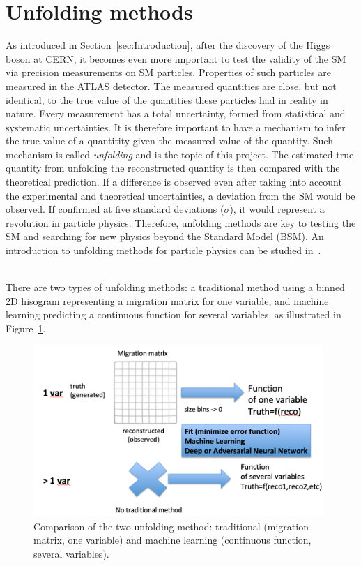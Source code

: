 \section{Unfolding methods}
\label{sec:UnfoldingMethods}

As introduced in Section~\ref{sec:Introduction}, after the discovery of the Higgs boson at CERN, it becomes even more important to test the validity of the SM via precision measurements on SM particles. Properties of such particles are measured in the ATLAS detector. The measured quantities are close, but not identical, to the true value of the quantities these particles had in reality in nature. Every measurement has a total uncertainty, formed from statistical and systematic uncertainties. It is therefore important to have a mechanism to infer the true value of a quantitity given the measured value of the quantity. Such mechanism is called \emph{unfolding} and is the topic of this project. The estimated true quantity from unfolding the reconstructed quantity is then compared with the theoretical prediction. If a difference is observed even after taking into account the experimental and theoretical uncertainties, a deviation from the SM would be observed. If confirmed at five standard deviations ($\sigma$), it would represent a revolution in particle physics. Therefore, unfolding methods are key to testing the SM and searching for new physics beyond the Standard Model (BSM). An introduction to unfolding methods for particle physics can be studied in~\cite{UnfoldingStatSchool}.

\ \\There are two types of unfolding methods: a traditional method using a binned 2D hisogram representing a migration matrix for one variable, and machine learning predicting a continuous function for several variables, as illustrated in Figure~\ref{fig:TwoUnfoldingTechniques}. 

\begin{figure}[t]
  \centering
  \includegraphics[width=0.98\textwidth]{../presentation/plots/Unfolding_Traditional_ML.png}
  \caption{Comparison of the two unfolding method: traditional (migration matrix, one variable) and machine learning (continuous function, several variables).}
  \label{fig:TwoUnfoldingTechniques}
\end{figure}

